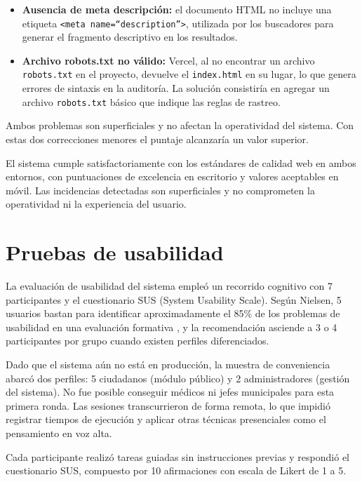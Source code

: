 \begin{itemize}
    \item \textbf{Ausencia de meta descripción:} el documento HTML no incluye una etiqueta \texttt{<meta name=``description''>}, utilizada por los buscadores para generar el fragmento descriptivo en los resultados.

    \item \textbf{Archivo robots.txt no válido:} Vercel, al no encontrar un archivo \texttt{robots.txt} en el proyecto, devuelve el \texttt{index.html} en su lugar, lo que genera errores de sintaxis en la auditoría. La solución consistiría en agregar un archivo \texttt{robots.txt} básico que indique las reglas de rastreo.
\end{itemize}

Ambos problemas son superficiales y no afectan la operatividad del sistema. 
Con estas dos correcciones menores el puntaje alcanzaría un valor superior.

El sistema cumple satisfactoriamente con los estándares de calidad web en ambos entornos, con puntuaciones de excelencia en escritorio y valores aceptables en móvil. 
Las incidencias detectadas son superficiales y no comprometen la operatividad ni la experiencia del usuario.


\section{Pruebas de usabilidad}

La evaluación de usabilidad del sistema empleó un recorrido cognitivo con 7 participantes y el cuestionario SUS (System Usability Scale).
Según Nielsen, 5 usuarios bastan para identificar aproximadamente el 85\% de los problemas de usabilidad en una evaluación formativa \cite{nielsen2000}, y la recomendación asciende a 3 o 4 participantes por grupo cuando existen perfiles diferenciados.

Dado que el sistema aún no está en producción, la muestra de conveniencia abarcó dos perfiles: 5 ciudadanos (módulo público) y 2 administradores (gestión del sistema). 
No fue posible conseguir médicos ni jefes municipales para esta primera ronda. 
Las sesiones transcurrieron de forma remota, lo que impidió registrar tiempos de ejecución y aplicar otras técnicas presenciales como el pensamiento en voz alta.

Cada participante realizó tareas guiadas sin instrucciones previas y respondió el cuestionario SUS, compuesto por 10 afirmaciones con escala de Likert de 1 a 5.

